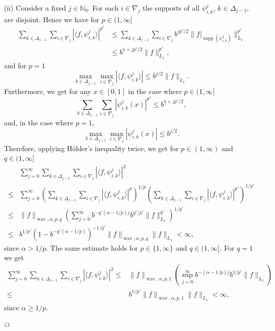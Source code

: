 \documentclass[12pt]{article}
\DeclareMathOperator{\wav}{wav}
\DeclareMathOperator{\supp}{supp}
\newenvironment{proof}{\begin{trivlist}
    \item[\hskip\labelsep{\it Proof.}]}{$\hfill\Box$\end{trivlist}}
\newcommand{\NN}{\mathbb{N}}
\begin{document}
\begin{proof}[Proof of Lemma \ref{Rem_meaningful_1}]
(ii) Consider a fixed $j\in\NN_0$. For each $i\in \nabla_j$ the supports of all $\psi^j_{i,k}$, $k\in \Delta_{j-1}$, are disjoint. Hence we have for $p\in (1,\infty]$
\begin{equation*}
\begin{split}
\sum_{k\in \Delta_{j-1}} \sum_{i\in \nabla_{j}} | \langle f, \psi^{j}_{i,k} \rangle  |^{p'}
&\le \sum_{k\in \Delta_{j-1}} \sum_{i\in \nabla_{j}} b^{jp'/2}
\| f|_{\supp(\psi_{i,k}^j)} \|_{L_1}^{p'}\\
&\le b^{1 + jp'/2} \|f\|^{p'}_{L_1},
\end{split}
\end{equation*}
and  for $p=1$
\begin{equation*}
 \max_{k\in \Delta_{j-1}} \max_{i\in \nabla_{j}} | \langle f, \psi^{j}_{i,k} \rangle  | \le b^{j/2} \|f\|_{L_1}.
\end{equation*}
Furthermore, we get for any $x\in [0,1]$ in the case where $p\in (1,\infty]$
\begin{equation*}
\sum_{k\in \Delta_{j-1}} \sum_{i\in \nabla_{j}} | \psi^{j}_{i,k} (x) |^{p'} \le b^{1 + jp'/2}, 
\end{equation*}
and, in the case where $p=1$,
\begin{equation*}
 \max_{k\in \Delta_{j-1}} \max_{i\in \nabla_{j}} | \psi^{j}_{i,k}(x) | \le b^{j/2}.
\end{equation*}
Therefore, applying H\"older's inequality twice, we get for $p\in (1,\infty)$ and $q\in (1,\infty]$
\begin{equation*}
\begin{split}
&\sum^\infty_{j=0} \sum_{k\in \Delta_{j-1}} \sum_{i\in \nabla_{j}} | \langle f, \psi^{j}_{i,k} \rangle  |^{2}\\
\le &\sum^\infty_{j=0} \left( \sum_{k\in \Delta_{j-1}} \sum_{i\in \nabla_{j}} | \langle f, \psi^{j}_{i,k} \rangle  |^{p} \right)^{1/p}    \left( \sum_{k\in \Delta_{j-1}} \sum_{i\in \nabla_{j}} | \langle f, \psi^{j}_{i,k} \rangle  |^{p'} \right)^{1/p'} \\ 
\le &\|f\|_{\wav,\alpha,p,q} \left( \sum_{j=0}^\infty b^{-q'(\alpha -1/p)j} b^{q'/p'}  \|f\|_{L_1}^{q'} \right)^{1/q'}\\
\le &b^{1/p'} \left( 1- b^{-q'(\alpha -1/p)} \right)^{-1/q'} \|f\|_{\wav,\alpha,p,q} \|f\|_{L_1} <\infty,
\end{split}
\end{equation*}
since $\alpha > 1/p$. The same estimate holds for $p\in\{1,\infty\}$ and $q\in (1,\infty]$.
For $q=1$ we get 
\begin{equation*}
\begin{split}
\sum^\infty_{j=0} \sum_{k\in \Delta_{j-1}} \sum_{i\in \nabla_{j}} | \langle f, \psi^{j}_{i,k} \rangle  |^{2}
\le &\|f\|_{\wav,\alpha,p,1} \left( \sup_{j=0}^\infty b^{-(\alpha -1/p)j} b^{1/p'}  \|f\|_{L_1} \right)\\
\le &b^{1/p'} \|f\|_{\wav,\alpha,p,1} \|f\|_{L_1} <\infty,
\end{split}
\end{equation*}
since $\alpha \ge 1/p$. 


\end{proof}
\end{document}
